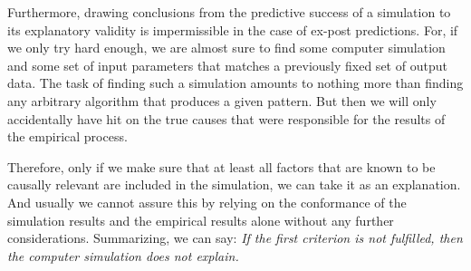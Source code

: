 Furthermore, drawing conclusions from the predictive success of a
simulation to its explanatory validity is impermissible in the case of
ex-post predictions. For, if we only try hard enough, we are almost
sure to find some computer simulation and some set of input parameters
that matches a previously fixed set of output data. The task of
finding such a simulation amounts to nothing more than finding any
arbitrary algorithm that produces a given pattern. But then we will
only accidentally have hit on the true causes that were responsible for
the results of the empirical process.

Therefore, only if we make sure that at least all factors that are
known to be causally relevant are included in the simulation, we can
take it as an explanation. And usually we cannot assure this by
relying on the conformance of the simulation results and the empirical
results alone without any further considerations.  Summarizing, we can
say: {\em If the first criterion is not fulfilled, then the computer
  simulation does not explain.}

